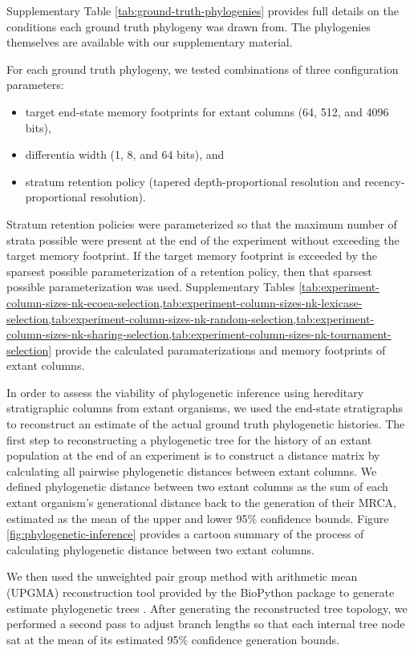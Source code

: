 Supplementary Table \ref{tab:ground-truth-phylogenies} provides full details on the conditions each ground truth phylogeny was drawn from.
The phylogenies themselves are available with our supplementary material.

For each ground truth phylogeny, we tested combinations of three configuration parameters:
\begin{itemize}
  \item target end-state memory footprints for extant columns (64, 512, and 4096 bits),
  \item differentia width (1, 8, and 64 bits), and
  \item stratum retention policy (tapered depth-proportional resolution and recency-proportional resolution).
\end{itemize}

Stratum retention policies were parameterized so that the maximum number of strata possible were present at the end of the experiment without exceeding the target memory footprint.
If the target memory footprint is exceeded by the sparsest possible parameterization of a retention policy, then that sparsest possible parameterization was used.
Supplementary Tables \cref{tab:experiment-column-sizes-nk-ecoea-selection,tab:experiment-column-sizes-nk-lexicase-selection,tab:experiment-column-sizes-nk-random-selection,tab:experiment-column-sizes-nk-sharing-selection,tab:experiment-column-sizes-nk-tournament-selection} provide the calculated paramaterizations and memory footprints of extant columns.



In order to assess the viability of phylogenetic inference using hereditary stratigraphic columns from extant organisms, we used the end-state stratigraphs to reconstruct an estimate of the actual ground truth phylogenetic histories.
The first step to reconstructing a phylogenetic tree for the history of an extant population at the end of an experiment is to construct a distance matrix by calculating all pairwise phylogenetic distances between extant columns.
We defined phylogenetic distance between two extant columns as the sum of each extant organism's generational distance back to the generation of their MRCA, estimated as the mean of the upper and lower 95\% confidence bounds.
Figure \ref{fig:phylogenetic-inference} provides a cartoon summary of the process of calculating phylogenetic distance between two extant columns.

We then used the unweighted pair group method with arithmetic mean (UPGMA) reconstruction tool provided by the BioPython package to generate estimate phylogenetic trees \citep{cock2009biopython,sokal1958statistical}.
After generating the reconstructed tree topology, we performed a second pass to adjust branch lengths so that each internal tree node sat at the mean of its estimated 95\% confidence generation bounds.

